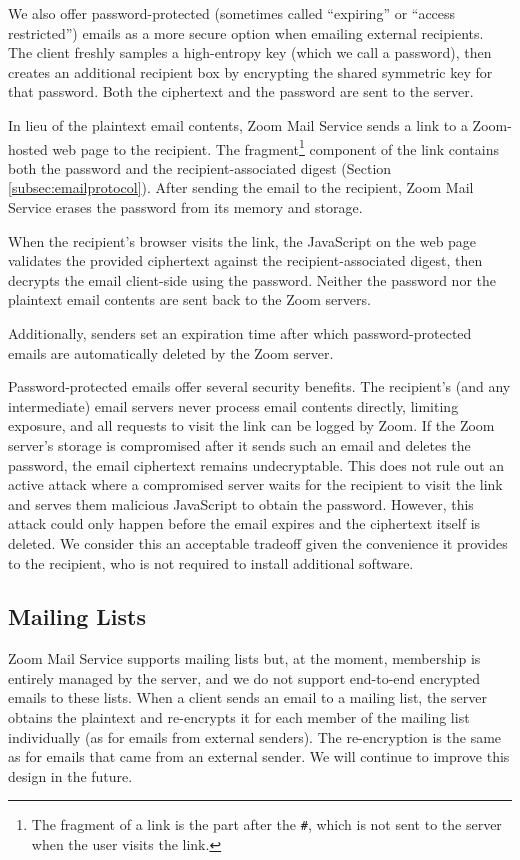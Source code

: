 We also offer password-protected (sometimes called ``expiring'' or ``access restricted'') emails as a more secure option
when emailing external recipients. The client freshly samples a high-entropy key (which we call a password), then
creates an additional recipient box by encrypting the shared symmetric key for that password. Both the ciphertext
and the password are sent to the server.

In lieu of the plaintext email contents, Zoom Mail Service sends a link to a
Zoom-hosted web page to the recipient. The fragment\footnote{The fragment of a link is the part after
the \texttt{\#}, which is not sent to the server when the user visits the
link.} component of the link contains both the password and the recipient-associated digest (Section \ref{subsec:emailprotocol}). After sending the email to the recipient, Zoom Mail Service erases the password from its memory and storage.

When the recipient's browser visits the link, the JavaScript on the web
page validates the provided ciphertext against the recipient-associated digest, then
decrypts the email client-side using the password.
Neither the password nor the plaintext email contents are sent back to the Zoom
servers. 

Additionally, senders set an expiration time after which password-protected emails are automatically deleted by the Zoom server.

Password-protected emails offer several security benefits. The recipient's (and any intermediate) email servers never process email contents directly, limiting exposure, and all requests to visit the link can be logged by Zoom.
If the Zoom server's storage is compromised after it sends such an email and deletes the
password, the email ciphertext remains undecryptable. This does not rule out an active attack where
a compromised server waits for the recipient to visit the link and serves them malicious JavaScript
to obtain the password. However, this attack could only happen before the email expires and the
ciphertext itself is deleted. We consider this an acceptable tradeoff given the convenience it
provides to the recipient, who is not required to install additional software.

\subsection{Mailing Lists}

Zoom Mail Service supports mailing lists but, at the moment, membership is entirely managed by the
server, and we do not support end-to-end encrypted emails to these lists. When a client sends an
email to a mailing list, the server obtains the plaintext and re-encrypts it for each member of the
mailing list individually (as for emails from external senders). The re-encryption is the same as
for emails that came from an external sender. We will continue to improve this design in the future.

